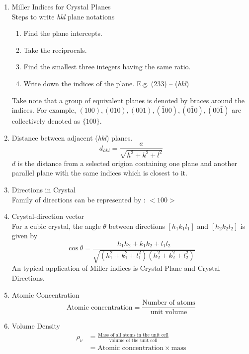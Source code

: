 \documentclass{article}
\begin{document}
\begin{enumerate}
\begin{center}
    \end{center}
    \item Miller Indices for Crystal Planes\\
    Steps to write \textit{hkl} plane notations
    \begin{enumerate}
        \item Find the plane intercepts.
        \item Take the reciprocals.
        \item Find the smallest three integers having the same ratio.
        \item Write down the indices of the plane. E.g. (233) -- (\textit{hkl})
    \end{enumerate}
    Take note that a group of equivalent planes is denoted by braces around the indices. For example, $(100),(010),(001),(\bar{1}00),(0\bar{1}0),(00\bar{1})$ are collectively denoted as $\{100\}$.
    \item Distance between adjacent (\textit{hkl}) planes.\\
    \begin{equation}
        d_{hkl} = \frac{a}{\sqrt{h^2+k^2+l^2}}
    \end{equation}
    $d$ is the distance from a selected origion containing one plane and another parallel plane with the same indices which is closest to it.
    \item Directions in Crystal \\
    Family of directions can be represented by : $<100>$
    \item Crystal-direction vector \\
    For a cubic crystal, the angle $\theta$ between directions $[h_1k_1l_1]$ and $[h_2k_2l_2]$ is given by
    \begin{equation}
        \cos \theta = \frac{h_1h_2+k_1k_2+l_1l_2}{\sqrt{(h_1^2+k_1^2+l_1^2)(h_2^2+k_2^2+l_2^2)}}
    \end{equation}
    An typical application of Miller indices is Crystal Plane and Crystal Directions.
    \item Atomic Concentration 
    \[\text{Atomic concentration} = \frac{\text{Number of atoms}}{\text{unit volume}}\]
    \item Volume Density 
    \begin{align*}
        \rho_\nu &= \frac{\text{Mass of all atoms in the unit cell}}{\text{volume of the unit cell}} \\
        &= \text{Atomic concentration} \times \text{mass}
    \end{align*}

\end{enumerate}
\end{document}
